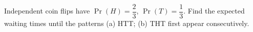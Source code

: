 Independent coin flips have $\Pr(H)=\dfrac{2}{3}$, $\Pr(T)=\dfrac{1}{3}$. Find the expected waiting times until the patterns (a) HTT; (b) THT first appear consecutively.
